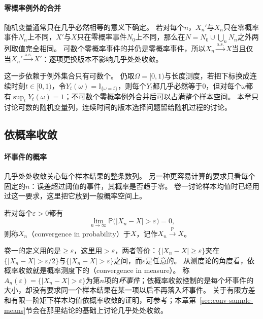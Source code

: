 \paragraph{零概率例外的合并}
随机变量通常只在几乎必然相等的意义下确定。
若对每个$n$，$X_n'$与$X_n$只在零概率事件$N_n$上不同，$X'$与$X$只在零概率事件$N_0$上不同，那么在$N=N_0\cup\bigcup_nN_n$之外两列取值完全相同。
可数个零概率事件的并仍是零概率事件，所以$X_n\xrightarrow{\mathrm{a.s.}}X$当且仅当$X_n'\xrightarrow{\mathrm{a.s.}}X'$：逐项更换版本不影响几乎处处收敛。

这一步依赖于例外集合只有可数个。
仍取$\Omega=[0,1)$与长度测度，若把下标换成连续时刻$t\in[0,1)$，令$Y_t(\omega)=\mathbb I_{\{\omega=t\}}$，则每个$Y_t$都几乎必然等于$0$，但对每个$\omega$都有$\sup_tY_t(\omega)=1$；不可数个零概率例外合并后可以占满整个样本空间。
本章只讨论可数的随机变量列，连续时间的版本选择问题留给随机过程的讨论。

\subsection{依概率收敛}

\paragraph{坏事件的概率}
几乎处处收敛关心每个样本结果的整条数列。
另一种更容易计算的要求只看每个固定的$n$：误差超过阈值的事件，其概率是否趋于零。
卷一讨论样本均值时已经用过这一要求，这里把它放到一般概率空间上。

\begin{definition}[依概率收敛]
\label{def:conv-probability}
若对每个$\varepsilon>0$都有
\[
  \lim_{n\to\infty}\mathbb P\bigl(|X_n-X|>\varepsilon\bigr)=0,
\]
则称$X_n$（convergence in probability）于$X$，记作$X_n\xrightarrow{\mathbb P}X$。
\end{definition}

卷一的定义用的是$\geq\varepsilon$，这里用$>\varepsilon$，两者等价：$\{|X_n-X|\geq\varepsilon\}$夹在$\{|X_n-X|>\varepsilon/2\}$与$\{|X_n-X|>\varepsilon\}$之间，而$\varepsilon$是任意的。
从测度论的角度看，依概率收敛就是概率测度下的（convergence in measure）。
称$A_n(\varepsilon)=\{|X_n-X|>\varepsilon\}$为第$n$项的\emph{坏事件}；依概率收敛控制的是每个坏事件的大小，却没有要求同一个样本结果在某一项以后不再落入坏事件。
关于有限方差和有限一阶矩下样本均值依概率收敛的证明，可参考；本章第~\ref{sec:conv-sample-means}节会在那里结论的基础上讨论几乎处处收敛。

